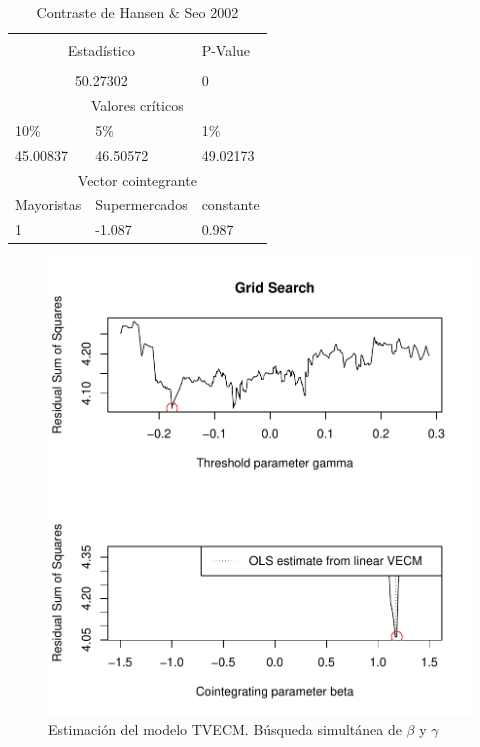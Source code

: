 \begin{table}[H]
\centering
\caption{Contraste de Hansen \& Seo 2002}
\begin{tabular}{@{}lll@{}}
\toprule \\ 
\multicolumn{2}{c}{Estadístico} & P-Value \\
\midrule \\ 
\multicolumn{2}{c}{50.27302}  & 0 \\
\bottomrule 
\multicolumn{3}{c}{Valores críticos} \\
10\% & 5\% & 1\% \\
\midrule
45.00837 & 46.50572 & 49.02173 \\
\bottomrule 
\multicolumn{3}{c}{Vector cointegrante} \\
\midrule 
Mayoristas & Supermercados & constante \\ 
1             & -1.087 & 0.987 \\
\bottomrule 
\bottomrule
\end{tabular}
\end{table}


\begin{figure}[H]
\centering
\caption{Estimación del modelo TVECM. Búsqueda simultánea de $\beta$ y $\gamma$}
\includegraphics[scale=0.7]{fig_results/fig7.pdf}
\end{figure}


